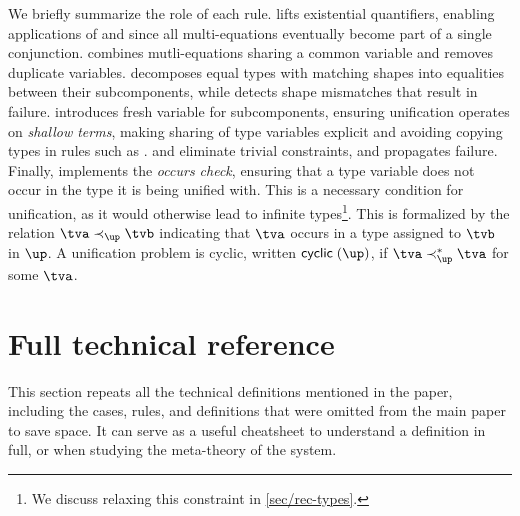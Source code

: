 \documentclass[acmsmall,screen,nonacm,review]{acmart}
\begin{document}

We briefly summarize the role of each rule.  lifts existential
quantifiers, enabling applications of  and  since
all multi-equations eventually become part of a single conjunction.
 combines mutli-equations sharing a common variable and
 removes duplicate variables.  decomposes equal
types with matching shapes into equalities between their subcomponents, while
 detects shape mismatches that result in failure. 
introduces fresh variable for subcomponents, ensuring unification operates on
\emph{shallow terms}, making sharing of type variables explicit and avoiding
copying types in rules such as .  and
 eliminate trivial constraints, and  propagates
failure.
%
Finally,  implements the \emph{occurs check}, ensuring that a
type variable does not occur in the type it is being unified with. This is a
necessary condition for unification, as it would otherwise lead to infinite
types\footnote{We discuss relaxing this constraint in \cref{sec/rec-types}.}.
This is formalized by the relation $\tv \prec_\up \tvb$ indicating that $\tv$
occurs in a type assigned to $\tvb$ in $\up$. A unification problem is cyclic,
written $\cyclic \up$, if $\tv \prec_\up^* \tv$ for some $\tv$.

\clearpage
\section{Full technical reference}
\label{appendix:figures}
\label{app:full-reference}

This section repeats all the technical definitions mentioned in the paper,
including the cases, rules, and definitions that were omitted from the main
paper to save space. It can serve as a useful cheatsheet to understand a
definition in full, or when studying the meta-theory of the system.
\end{document}
